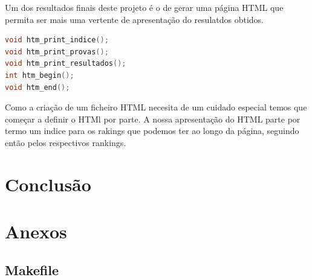 \documentclass[11pt, a4paper, oneside]{article}
\begin{document}
Um dos resultados finais deste projeto é o de gerar uma página HTML que permita ser mais uma vertente de apresentação do resulatdos obtidos.


\begin{lstlisting}[language=C, caption={Assinatura das funções.}]
void htm_print_indice();
void htm_print_provas();
void htm_print_resultados();
int htm_begin();
void htm_end();
\end{lstlisting}

Como a criação de um ficheiro HTML necesita de um cuidado especial temos que começar a definir o HTMl por parte.
A nossa apresentação do HTML parte por termo um indice para os rakings que podemos ter ao longo da página, seguindo então pelos respectivos rankings.


\newpage
\section{Conclusão}

\newpage
\section{Anexos}

\subsection{Makefile}
\end{document}
